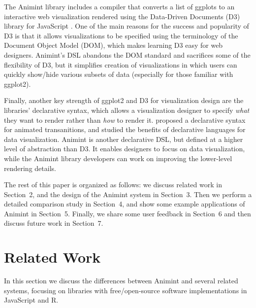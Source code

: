 \documentclass[10pt,journal,compsoc]{IEEEtran}\usepackage[]{graphicx}\usepackage[]{color}
\begin{document}
The Animint library includes a compiler that converts a list of
ggplots to an interactive web visualization rendered using the
Data-Driven Documents (D3) library for JavaScript \citep{d3}. One of
the main reasons for the success and popularity of D3 is that it
allows visualizations to be specified using the terminology of the
Document Object Model (DOM), which makes learning D3 easy for web
designers. Animint's DSL abandons the DOM standard and sacrifices some
of the flexibility of D3, but it
simplifies creation of visualizations in which users can quickly show/hide
various subsets of data (especially for those familiar with ggplot2).

Finally, another key strength of ggplot2 and D3 for visualization
design are the libraries' declarative syntax, which allows a
visualization designer to specify \emph{what} they want to render
rather than \emph{how} to render it. \citet{declarative} proposed a
declarative syntax for animated transanitions, and studied the
benefits of declarative languages for data visualization. Animint is
another declarative DSL, but defined at a higher level of abstraction
than D3. It enables designers to focus on data visualization, while
the Animint library developers can work on improving the lower-level
rendering details.

The rest of this paper is organized as follows: we discuss related work in
Section~2, and the design of the Animint system in Section~3. Then we
perform a detailed comparison study in Section~4, and
show some example applications of Animint in Section~5. Finally, we
share some user feedback in Section~6 and then discuss future work in
Section~7.


\section{Related Work}

In this section we discuss the differences between Animint and several
related systems, focusing on libraries with free/open-source software
implementations in JavaScript and R.
\end{document}
